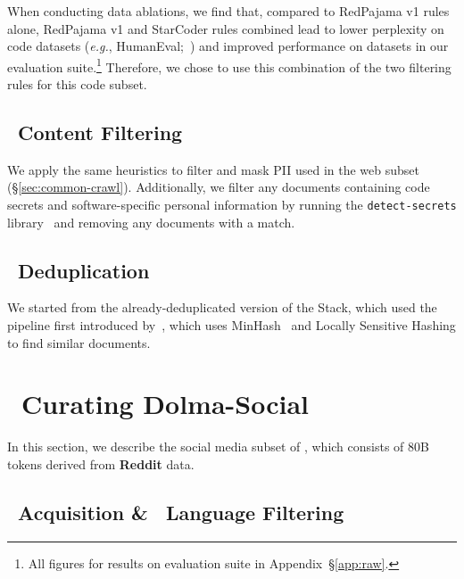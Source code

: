 When conducting data ablations, we find that, compared to RedPajama v1 rules alone, RedPajama v1 and StarCoder rules combined lead to lower perplexity on code datasets (\textit{e.g.}, HumanEval;~\citealp{chen2021evaluating}) and
improved performance on datasets in our evaluation suite.\footnote{All figures for results on evaluation suite in Appendix~\S\ref{app:raw}.
}
Therefore, we chose to use this combination of the two filtering rules for this \dolma code subset.

\subsection{\toolkitFilter~Content Filtering} 

We apply the same heuristics to filter and mask PII used in the web subset (\S\ref{sec:common-crawl}). 
Additionally, we filter any documents containing code secrets and software-specific personal information by running the \texttt{detect-secrets} library~\citep{DetectSecrets} and removing any documents with a match.

\subsection{\toolkitDedupe~Deduplication} 

We started from the already-deduplicated version of the Stack, which used the pipeline first introduced by~\citet{Allal2023SantaCoder}, which uses MinHash~\citep{Broder2002-ra} and Locally Sensitive Hashing to find similar documents. 







\section{\dolmaSocial~Curating Dolma-Social}
\label{sec:curating-dolma-social}




\label{sec:pushshift-reddit-forum}

In this section, we describe the social media subset of \dolma,  which consists of 80B tokens derived from \textbf{Reddit} data.


\subsection{\toolkitWget~Acquisition \& \toolkitFilter~Language Filtering}

